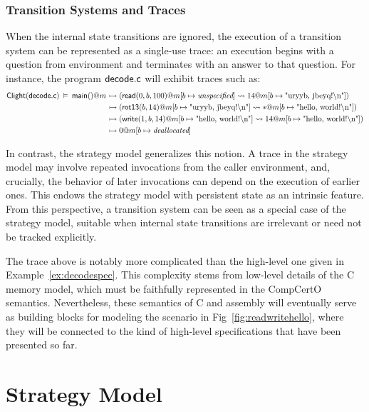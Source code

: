 \subsubsection{Transition Systems and Traces}

When the internal state transitions
are ignored,
the execution of a transition system
can be represented as a single-use trace:
an execution begins with a question from environment
and terminates with an answer to that question.
For instance,
the program $ \mathsf{decode.c} $ will exhibit traces such as:
{\scriptsize
  \begin{align*}
     \mathsf{Clight} ( \mathsf{decode.c} ) \:\vDash\:
     \mathsf{main} ()@m &\rightarrowtail
    ( \mathsf{read} (0, b, 100)@m[b \mapsto \textit{unspecified}] \leadsto
    14@m[b \mapsto \texttt{\textnormal{"uryyb, jbeyq!\textbackslash{}n"}}]) \\& \rightarrowtail
    ( \mathsf{rot13} (b, 14)@m[b \mapsto \texttt{\textnormal{"uryyb, jbeyq!\textbackslash{}n"}}] \leadsto
    {*}@m[b \mapsto \texttt{\textnormal{"hello, world!\textbackslash{}n"}}]) \\& \rightarrowtail
    ( \mathsf{write} (1, b, 14)@m[b \mapsto \texttt{\textnormal{"hello, world!\textbackslash{}n"}}] \leadsto
    14@m[b \mapsto \texttt{\textnormal{"hello, world!\textbackslash{}n"}}]) \\& \rightarrowtail
    0@m[b \mapsto \textit{deallocated}]
  \end{align*}
}%

In contrast,
the strategy model
generalizes this notion.
A trace in the strategy model
may involve repeated invocations from the caller environment,
and, crucially,
the behavior of later invocations
can depend on the execution of earlier ones.
This endows the strategy model
with persistent state as an intrinsic feature.
From this perspective,
a transition system can be seen as
a special case of the strategy model,
suitable when internal state transitions are irrelevant
or need not be tracked explicitly.

The trace above is notably more complicated than
the high-level one given in Example~\ref{ex:decodespec}.
This complexity stems from low-level details of
the C memory model,
which must be faithfully represented in the CompCertO semantics.
Nevertheless,
these semantics of C and assembly will eventually
serve as building blocks for modeling the scenario in Fig~\ref{fig:readwritehello},
where they will be connected to the kind of high-level specifications
that have been presented so far.

\section{Strategy Model}
\label{sec:strat:model}

